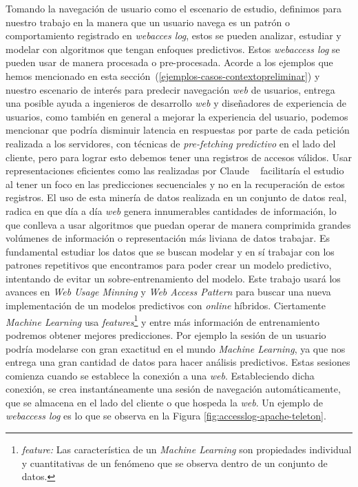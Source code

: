 	Tomando la navegación de usuario como el escenario de estudio, definimos para nuestro trabajo en la manera que un usuario navega es un patrón o comportamiento registrado en \emph{webacces log}, estos se pueden analizar, estudiar y modelar con algoritmos que tengan enfoques predictivos. Estos \emph{webaccess log} se pueden usar de manera procesada o pre-procesada. Acorde a los ejemplos que hemos mencionado en esta sección~(\ref{ejemplos-casos-contextopreliminar})  y nuestro escenario de interés para predecir navegación \emph{web} de usuarios, entrega una posible ayuda a ingenieros de desarrollo \emph{web} y diseñadores de experiencia de usuarios, como también en general a mejorar la experiencia del usuario, podemos mencionar que podría disminuir latencia en respuestas por parte de cada petición realizada a los servidores, con técnicas de \emph{pre-fetching predictivo} en el lado del cliente, pero para lograr esto debemos tener una registros de accesos válidos. Usar representaciones eficientes como las realizadas por Claude \etal~\cite{Claude2014} facilitaría el estudio al tener un foco en las predicciones secuenciales y no en la recuperación de estos registros. El uso de esta  minería de datos realizada en un conjunto de datos real, radica en que día a día \emph{web} genera  innumerables cantidades de información, lo que conlleva a usar algoritmos que puedan operar de manera comprimida grandes volúmenes de información o representación más liviana de datos trabajar. Es fundamental estudiar los datos que se buscan modelar y en sí trabajar con los patrones repetitivos que encontramos para poder crear un modelo predictivo, intentando de evitar un sobre-entrenamiento del modelo. Este trabajo usará los avances en \emph{Web Usage Minning} y \emph{Web Access Pattern} para buscar una nueva implementación de un modelos predictivos con  \emph{online} híbridos. Ciertamente \emph{Machine Learning} usa \emph{features}\footnote{\emph{feature:} Las característica de un \emph{Machine Learning} son propiedades individual y cuantitativas de un fenómeno que se observa dentro de un conjunto de datos.} y entre más información de entrenamiento podremos  obtener mejores predicciones. Por ejemplo la sesión de un usuario podría modelarse con gran exactitud en el mundo \emph{Machine Learning}, ya que nos entrega una gran cantidad de datos para hacer análisis predictivos. Estas sesiones comienza cuando se establece la conexión a una \emph{web}. Estableciendo dicha conexión, se crea instantáneamente una sesión de navegación automáticamente, que se almacena en el lado del cliente o que hospeda la \emph{web}. Un ejemplo de \emph{webaccess log} es lo que se observa en la Figura \ref{fig:accesslog-apache-teleton}.

